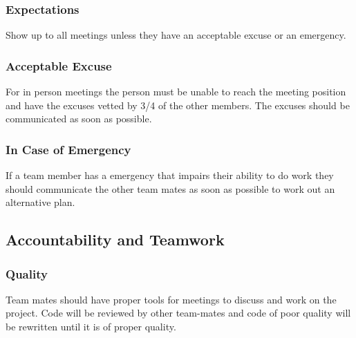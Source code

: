 \documentclass{article}
\begin{document}
\subsubsection*{Expectations}

Show up to all meetings unless they have an acceptable excuse or an emergency. 

\subsubsection*{Acceptable Excuse}

For in person meetings the person must be unable to reach the meeting position and have the excuses vetted by 3/4 of the other members. The excuses should be communicated as soon as possible.  

\subsubsection*{In Case of Emergency}


If a team member has a emergency that impairs their ability to do work they should communicate the other team mates as soon as possible to work out an alternative plan.

\subsection*{Accountability and Teamwork}

\subsubsection*{Quality} 

Team mates should have proper tools for meetings to discuss and work on the project.
Code will be reviewed by other team-mates and code of poor quality will be rewritten  until it is of proper quality.
\end{document}

